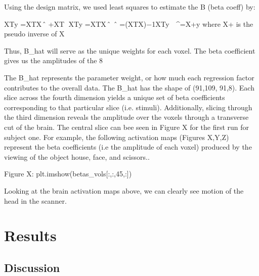 \documentclass[11pt]{article}
\begin{document}
Using the design matrix, we used least squares to estimate the B (beta coeff) by:
                                                          
                 XTy⃗ =XTXβ⃗ ̂ +XTε⃗     
				     XTy⃗ =XTXβ⃗ ̂ 
				     β⃗ ̂ =(XTX)−1XTy⃗ 
                                                       β⃗ ^=X+y     	where X+ is the pseudo inverse of X			

Thus, B_hat will serve as the unique weights for each voxel. The beta coefficient gives us the amplitudes of the 8

The B_hat represents the parameter weight, or how much each regression factor contributes to the overall data. The B_hat has the shape of (91,109, 91,8). Each slice across the fourth dimension yields a unique set of beta coefficients corresponding to that particular slice (i.e. stimuli). Additionally, slicing through the third dimension reveals the amplitude over the voxels through a transverse cut of the brain. The central slice can bee seen in Figure X for the first run for subject one.
For example, the following activation maps (Figures X,Y,Z) represent the beta coefficients (i.e the amplitude of each voxel) produced by the viewing of the object house, face, and scissors..

				Figure X:  plt.imshow(betas_vols[:,:,45,:])


Looking at the brain activation maps above, we can clearly see motion of the head in the scanner. 



\subsection{}



\section{Results}

\subsection{Discussion}
\end{document}
